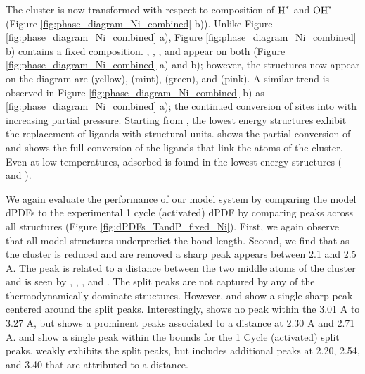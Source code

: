 \documentclass[journal=jctcce,manuscript=article]{achemso}
\begin{document}

The cluster is now transformed with respect to composition of $\ce{H^{*}}$ and $\ce{OH^{*}}$ (Figure \ref{fig:phase_diagram_Ni_combined} b)). Unlike Figure \ref{fig:phase_diagram_Ni_combined} a), Figure \ref{fig:phase_diagram_Ni_combined} b) contains a fixed  composition. , , , and  appear on both (Figure \ref{fig:phase_diagram_Ni_combined} a) and b); however, the structures now appear on the diagram are  (yellow),  (mint),  (green), and  (pink). A similar trend is observed in Figure \ref{fig:phase_diagram_Ni_combined} b) as \ref{fig:phase_diagram_Ni_combined} a); the continued conversion of  sites into  with increasing  partial pressure. Starting from , the lowest energy structures exhibit the replacement of  ligands with  structural units.  shows the partial conversion of and  shows the full conversion of the  ligands that link the  atoms of the cluster. Even at low temperatures, adsorbed  is found in the lowest energy structures ( and ). 

We again evaluate the performance of our model system by comparing the model dPDFs to the experimental 1 cycle (activated) dPDF by comparing peaks across all structures (Figure \ref{fig:dPDFs_TandP_fixed_Ni}). First, we again observe that all model structures underpredict the  bond length. Second, we find that as the cluster is reduced and  are removed a sharp peak appears between 2.1 and 2.5 A. The peak is related to a  distance between the two middle atoms of the cluster and is seen by , , , and . The split  peaks are not captured by any of the thermodynamically dominate structures. However,  and  show a single sharp peak centered around the split  peaks. Interestingly,  shows no peak within the 3.01 A to 3.27 A, but shows a prominent peaks associated to a  distance at 2.30 A and 2.71 A.  and  show a single peak within the bounds for the 1 Cycle (activated)  split peaks.  weakly exhibits the split  peaks, but includes additional peaks at 2.20, 2.54, and 3.40 that are attributed to a  distance.    
  
\end{document}
